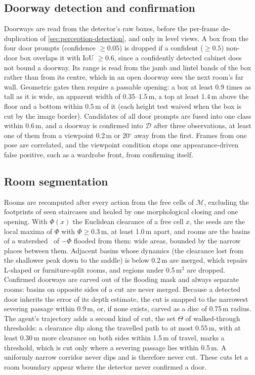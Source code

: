 \documentclass[10pt]{article}
\newcommand{\M}{\mathcal{M}}
\newcommand{\D}{\mathcal{D}}
\begin{document}
\subsection{Doorway detection and confirmation}\label{sec:perception-doors}

Doorways are read from the detector's raw boxes, before the per-frame de-duplication of
\cref{sec:perception-detection}, and only in level views. A box from the four door prompts (confidence $\geq 0.05$) is
dropped if a confident ($\geq 0.5$) non-door box overlaps it with IoU $\geq 0.6$, since a confidently detected cabinet
does not bound a doorway. Its range is read from the jamb and
lintel bands of the box rather than from its centre, which in an open doorway sees the next room's far wall. Geometric
gates then require a passable opening: a box at least 0.9 times as tall as it is wide, an apparent width of
0.35--1.5\,m, a top at least 1.4\,m above the floor and a bottom within 0.5\,m of it (each height test waived when the
box is cut by the image border). Candidates of all door prompts are fused into one class within 0.6\,m, and a doorway
is confirmed into $\D$ after three observations, at least one of them from a viewpoint 0.2\,m or 20$^\circ$ away from
the first. Frames from one pose are correlated, and the viewpoint condition stops one appearance-driven false
positive, such as a wardrobe front, from confirming itself.

\subsection{Room segmentation}\label{sec:perception-rooms}

Rooms are recomputed after every action from the free cells of $\M$, excluding the footprints of seen staircases and
healed by one morphological closing and one opening. With $\Phi(x)$ the Euclidean clearance of a free cell $x$, the
seeds are the local maxima of $\Phi$ with $\Phi \geq 0.3$\,m, at least 1.0\,m apart, and rooms are the basins of a
watershed~\citep{vincent1991watersheds} of $-\Phi$ flooded from them: wide areas, bounded by the narrow places between
them. Adjacent basins whose dynamics (the clearance lost from the shallower peak down to the saddle) is below 0.2\,m
are merged, which repairs L-shaped or furniture-split rooms, and regions under 0.5\,m$^2$ are dropped. Confirmed
doorways are carved out of the flooding mask and always separate rooms: basins on opposite sides of a cut are never
merged. Because a detected door inherits the error of its depth estimate, the cut is snapped to the narrowest severing
passage within 0.9\,m, or, if none exists, carved as a disc of 0.75\,m radius. The agent's trajectory adds a second
kind of cut, the set $\Theta$ of walked-through thresholds: a clearance dip along the travelled path to at most
0.55\,m, with at least 0.30\,m more clearance on both sides within 1.5\,m of travel, marks a threshold, which is cut
only where a severing passage lies within 0.5\,m. A uniformly narrow corridor never dips and is therefore never cut.
These cuts let a room boundary appear where the detector never confirmed a door.
\end{document}
